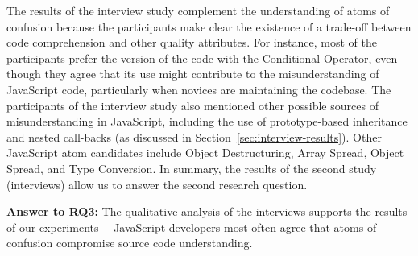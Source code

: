 The results of the interview study complement the understanding of atoms of confusion because the participants make clear the existence of a trade-off between
code comprehension and other quality attributes. For instance, most of the participants prefer the version of the code with the
Conditional Operator, even though they agree that its use might contribute to the misunderstanding of JavaScript code,
particularly when novices are maintaining the codebase. The participants of the interview study also
mentioned other possible sources of misunderstanding in JavaScript,
including the use of prototype-based inheritance and nested call-backs (as discussed in Section~\ref{sec:interview-results}). Other JavaScript atom candidates include
Object Destructuring, Array Spread, Object Spread, and Type Conversion.
In summary, the results of the second study (interviews) allow
us to answer the second research question.

\begin{mh}
  {\bf Answer to RQ3:} The qualitative analysis of the
  interviews supports the results of our experiments---
  JavaScript developers most often agree that atoms of confusion compromise
  source code understanding. 
\end{mh}




\subsection{}\label{sec:whytwo}


